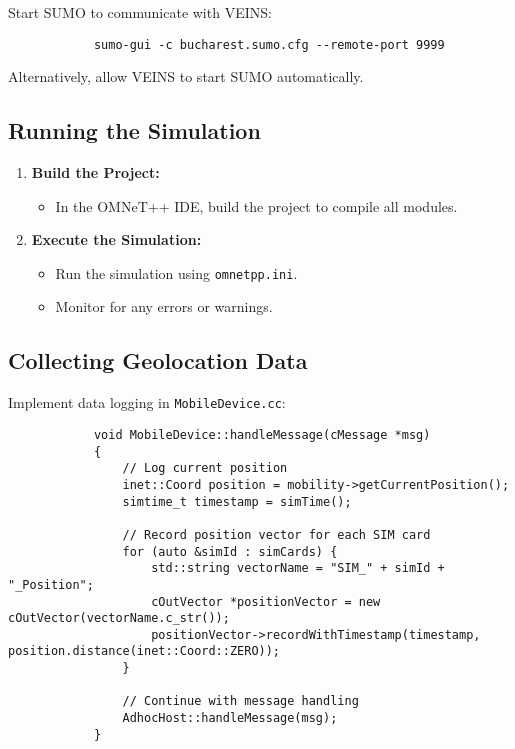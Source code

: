 \documentclass{article}
\begin{document}
		Start SUMO to communicate with VEINS:
		
		\begin{verbatim}
			sumo-gui -c bucharest.sumo.cfg --remote-port 9999
		\end{verbatim}
		
		Alternatively, allow VEINS to start SUMO automatically.
		
		\subsection{Running the Simulation}
		
		\begin{enumerate}
			\item \textbf{Build the Project:}
			\begin{itemize}
				\item In the OMNeT++ IDE, build the project to compile all modules.
			\end{itemize}
			\item \textbf{Execute the Simulation:}
			\begin{itemize}
				\item Run the simulation using \texttt{omnetpp.ini}.
				\item Monitor for any errors or warnings.
			\end{itemize}
		\end{enumerate}
		
		\subsection{Collecting Geolocation Data}
		
		Implement data logging in \texttt{MobileDevice.cc}:
		
		\begin{verbatim}
			void MobileDevice::handleMessage(cMessage *msg)
			{
				// Log current position
				inet::Coord position = mobility->getCurrentPosition();
				simtime_t timestamp = simTime();
				
				// Record position vector for each SIM card
				for (auto &simId : simCards) {
					std::string vectorName = "SIM_" + simId + "_Position";
					cOutVector *positionVector = new cOutVector(vectorName.c_str());
					positionVector->recordWithTimestamp(timestamp, position.distance(inet::Coord::ZERO));
				}
				
				// Continue with message handling
				AdhocHost::handleMessage(msg);
			}
		\end{verbatim}
		
\end{document}
